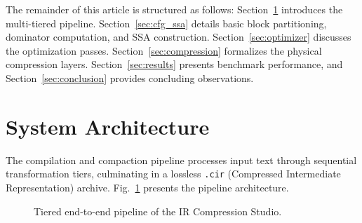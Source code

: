 \documentclass{ieeeaccess}
\begin{document}
The remainder of this article is structured as follows: Section~\ref{sec:architecture} introduces the multi-tiered pipeline. Section~\ref{sec:cfg_ssa} details basic block partitioning, dominator computation, and SSA construction. Section~\ref{sec:optimizer} discusses the optimization passes. Section~\ref{sec:compression} formalizes the physical compression layers. Section~\ref{sec:results} presents benchmark performance, and Section~\ref{sec:conclusion} provides concluding observations.

\section{System Architecture}
\label{sec:architecture} %
The compilation and compaction pipeline processes input text through sequential transformation tiers, culminating in a lossless \texttt{.cir} (Compressed Intermediate Representation) archive. Fig.~\ref{fig:architecture} presents the pipeline architecture.

\begin{figure}[htbp]
\centering
{}
\caption{Tiered end-to-end pipeline of the IR Compression Studio.}
\label{fig:architecture} %
\end{figure}
\end{document}
